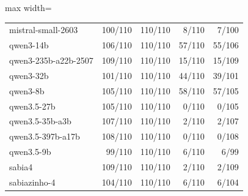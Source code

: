 \begin{table}[htbp]
\begin{adjustbox}{max width=\linewidth}
\begin{tabular}{lrrrr}
mistral-small-2603 & 100/110 & 110/110 & 8/110 & 7/100 \\
qwen3-14b & 106/110 & 110/110 & 57/110 & 55/106 \\
qwen3-235b-a22b-2507 & 109/110 & 110/110 & 15/110 & 15/109 \\
qwen3-32b & 101/110 & 110/110 & 44/110 & 39/101 \\
qwen3-8b & 105/110 & 110/110 & 58/110 & 57/105 \\
qwen3.5-27b & 105/110 & 110/110 & 0/110 & 0/105 \\
qwen3.5-35b-a3b & 107/110 & 110/110 & 2/110 & 2/107 \\
qwen3.5-397b-a17b & 108/110 & 110/110 & 0/110 & 0/108 \\
qwen3.5-9b & 99/110 & 110/110 & 6/110 & 6/99 \\
sabia4 & 109/110 & 110/110 & 2/110 & 2/109 \\
sabiazinho-4 & 104/110 & 110/110 & 6/110 & 6/104 \\
\bottomrule
\end{tabular}
\end{adjustbox}
\end{table}
